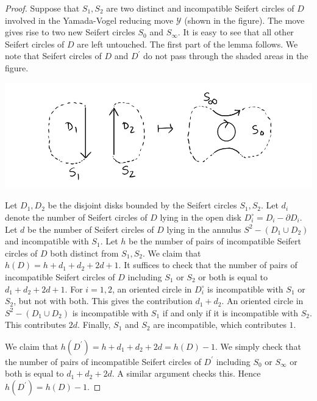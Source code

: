 \begin{proof}
  Suppose that $S_1, S_2$ are two distinct and incompatible Seifert circles of $D$ involved in the Yamada-Vogel reducing move $\mathcal{Y}$ (shown in the figure). The move gives rise to two new Seifert circles $S_0$ and $S_{\infty}$. It is easy to see that all other Seifert circles of $D$ are left untouched. The first part of the lemma follows. We note that Seifert circles of $D$ and $D^{\prime}$ do not pass through the shaded areas in the figure.

\begin{center}
 \includegraphics[scale=.25]{images/3.png}
\end{center}
  
  Let $D_1, D_2$ be the disjoint disks bounded by the Seifert circles $S_1, S_2$. Let $d_i$ denote the number of Seifert circles of $D$ lying in the open disk $D_i^{\circ} = D_i - \partial D_i$. Let $d$ be the number of Seifert circles of $D$ lying in the annulus $S^2 - (D_1 \cup D_2)$ and incompatible with $S_1$. Let $h$ be the number of pairs of incompatible Seifert circles of $D$ both distinct from $S_1, S_2$. We claim that $h(D) = h + d_1 + d_2 + 2d + 1$. It suffices to check that the number of pairs of incompatible Seifert circles of $D$ including $S_1$ or $S_2$ or both is equal to $d_1 + d_2 + 2d + 1$. For $i = 1, 2$, an oriented circle in $D_i^{\circ}$ is incompatible with $S_1$ or $S_2$, but not with both. This gives the contribution $d_1 + d_2$. An oriented circle in $S^2 - (D_1 \cup D_2)$ is incompatible with $S_1$ if and only if it is incompatible with $S_2$. This contributes $2d$. Finally, $S_1$ and $S_2$ are incompatible, which contributes $1$.

  We claim that $h(D^{\prime}) = h + d_1 + d_2 + 2d = h(D) - 1 $. We simply check that the number of pairs of incompatible Seifert circles of $D^{\prime}$ including $S_0$ or $S_{\infty}$ or both is equal to $d_1 + d_2 + 2d$. A similar argument checks this. Hence $h(D^{\prime}) = h(D) - 1$.
\end{proof}

